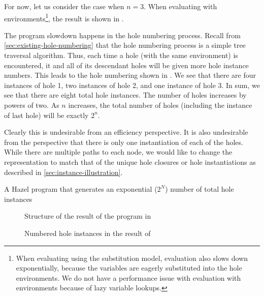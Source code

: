 For now, let us consider the case when $n=3$. When evaluating with environments\footnote{When evaluating using the substitution model, evaluation also slows down exponentially, because the variables are eagerly substituted into the hole environments. We do not have a performance issue with evaluation with environments because of lazy variable lookups.}, the result is shown in .

The program slowdown happens in the hole numbering process. Recall from \cref{sec:existing-hole-numbering} that the hole numbering process is a simple tree traversal algorithm. Thus, each time a hole (with the same environment) is encountered, it and all of its descendant holes will be given more hole instance numbers. This leads to the hole numbering shown in . We see that there are four instances of hole 1, two instances of hole 2, and one instance of hole 3. In sum, we see that there are eight total hole instances. The number of holes increases by powers of two. As $n$ increases, the total number of holes (including the instance of last hole) will be exactly $2^n$.

Clearly this is undesirable from an efficiency perspective. It is also undesirable from the perspective that there is only one instantiation of each of the holes. While there are multiple paths to each node, we would like to change the representation to match that of the unique hole closures or hole instantiations as described in \cref{sec:instance-illustration}.

\begin{listing}
  \centering
  \caption{A Hazel program that generates an exponential ($2^N$) number of total hole instances}
  \label{fig:hole_renumbering_problem}
\end{listing}

\begin{figure}
  \centering
  
  \caption{Structure of the result of the program in }
  \label{fig:hole-renumbering-solution-structure}
\end{figure}

\begin{figure}
  \centering
  
  \caption{Numbered hole instances in the result of }
  \label{fig:hole-renumbered-result}
\end{figure}

